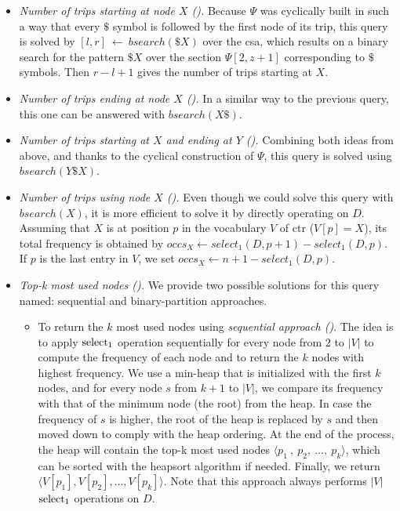 	\begin{itemize}[leftmargin=3mm]
	\setlength{\itemindent}{0mm}
	\item {\em Number of trips starting at node $X$ (\Sswx).}
	Because $\Psi$ was cyclically built in such a way that every $\$$ symbol is followed by the first node 
	of its trip, this query is solved by $[l,r]~\leftarrow~bsearch(\$X)$ over the \gls{csa}, 
	which results on a binary search for the pattern $\$X$ over the section $\Psi[2,z+1]$ corresponding to $\$$ symbols. 
	Then $r-l+1$ gives the number of trips starting at $X$.

	\item {\em Number of trips ending at node $X$ (\Sewx).} In a similar way to the previous query, 
	this one can be answered with $bsearch(X\$)$.

	\item {\em Number of trips starting at $X$ and ending at $Y$ (\Sfxty).}
	Combining both ideas from above, and thanks to the cyclical construction of $\Psi$, this query is solved 
	using $bsearch(Y\$X)$.

	\item {\em Number of trips using node $X$ (\Sux).}
	Even though we could solve this query with $bsearch(X)$, it is more efficient to solve it by directly operating on $D$. 
	 Assuming that $X$ is
	at position $p$ in the vocabulary $V$ of  \gls{ctr} ($V[p]=X$), its total frequency is obtained by
	$occs_X \leftarrow select_1(D,p+1) - select_1(D,p)$. %
	If $p$ is the last entry in $V$, we set $occs_X \leftarrow n+1-select_1(D,p)$.

	\setlength{\itemindent}{0mm}
	\item {\em Top-k most used nodes (\Stk).}
	We provide two possible solutions for this query named: %
	sequential and binary-partition approaches. 

	\begin{itemize}
	\item To return the $k$ most used nodes using {\em sequential approach (\Stkseq)}. The idea is
	to apply  $\operatorname{select}_1$ operation sequentially for every node from $2$ to $|V|$ to compute the 
	frequency of each node and to return the $k$ nodes with highest frequency.
	We use a min-heap that is initialized with
	the first $k$ nodes, and for every node $s$ from $k+1$ to $|V|$, 
	we compare its frequency with that of the minimum node (the root) from
	the heap. In case the frequency of $s$ is higher, the root of the heap is replaced by $s$ and
	then moved down to comply with the heap ordering. At the end of the process, the heap
	will contain the top-k most used nodes $\langle p_1\:,\:p_2,\:\dots,\:p_k \rangle$, which can be 
	sorted with the heapsort algorithm if needed. Finally, we return $\langle V[p_1],V[p_2],\dots,V[p_k]\rangle$.
	Note that this  approach always performs $|V|$ $\operatorname{select}_1$ operations on $D$.


\end{itemize}
\end{itemize}
